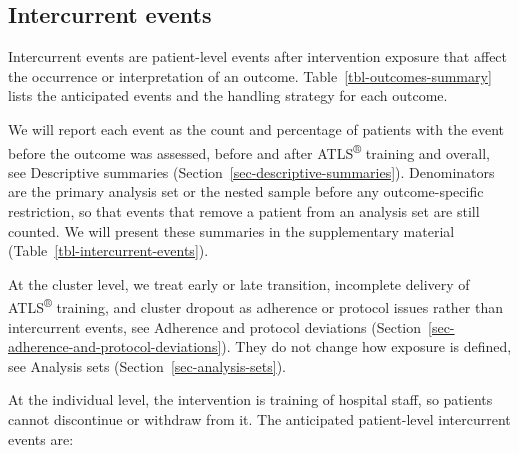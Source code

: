\documentclass[
]{scrartcl}
\begin{document}
\subsection{Intercurrent events}\label{sec-intercurrent-events}

Intercurrent events are patient-level events after intervention exposure
that affect the occurrence or interpretation of an outcome.
Table~\ref{tbl-outcomes-summary} lists the anticipated events and the
handling strategy for each outcome.

We will report each event as the count and percentage of patients with
the event before the outcome was assessed, before and after
ATLS\textsuperscript{®} training and overall, see Descriptive summaries
(Section~\ref{sec-descriptive-summaries}). Denominators are the primary
analysis set or the nested sample before any outcome-specific
restriction, so that events that remove a patient from an analysis set
are still counted. We will present these summaries in the supplementary
material (Table~\ref{tbl-intercurrent-events}).

At the cluster level, we treat early or late transition, incomplete
delivery of ATLS\textsuperscript{®} training, and cluster dropout as
adherence or protocol issues rather than intercurrent events, see
Adherence and protocol deviations
(Section~\ref{sec-adherence-and-protocol-deviations}). They do not
change how exposure is defined, see Analysis sets
(Section~\ref{sec-analysis-sets}).

At the individual level, the intervention is training of hospital staff,
so patients cannot discontinue or withdraw from it. The anticipated
patient-level intercurrent events are:
\end{document}

